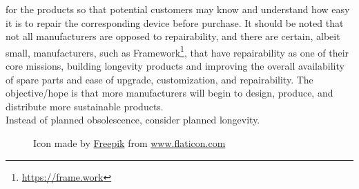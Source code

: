 for the products so that potential customers may know and understand how easy it
is to repair the corresponding device before purchase. It should be noted that not
all manufacturers are opposed to repairability, and there are certain, albeit small,
manufacturers, such as Framework\footnote{\url{https://frame.work}}, that have
repairability as one of their core missions, building longevity products and improving
the overall availability of spare parts and ease of upgrade, customization, and repairability.
The objective/hope is that more manufacturers will begin to design, produce, and
distribute more sustainable products. \\ %
Instead of planned obsolescence, consider planned longevity. \\ %

\begin{figure} %
  \centering
  \def\stackalignment{r} %
  {\scriptsize \parbox[t]{\linewidth}{ Icon made by \href{https://www.flaticon.com/authors/freepik}{Freepik} from \href{http://www.flaticon.com}{www.flaticon.com} }}
\end{figure}

